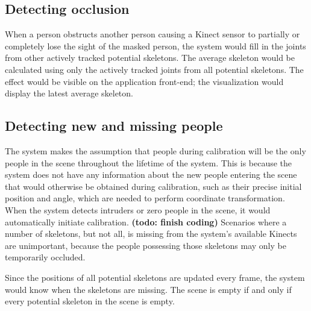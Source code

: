 \subsection{Detecting occlusion}

When a person obstructs another person causing a Kinect sensor to partially or completely lose the sight of the masked person, the system would fill in the joints from other actively tracked potential skeletons. The average skeleton would be calculated using only the actively tracked joints from all potential skeletons. The effect would be visible on the application front-end; the visualization would display the latest average skeleton.

\subsection{Detecting new and missing people}

The system makes the assumption that people during calibration will be the only people in the scene throughout the lifetime of the system. This is because the system does not have any information about the new people entering the scene that would otherwise be obtained during calibration, such as their precise initial position and angle, which are needed to perform coordinate transformation. When the system detects intruders or zero people in the scene, it would automatically initiate calibration. \textbf{(todo: finish coding)} Scenarios where a number of skeletons, but not all, is missing from the system's available Kinects are unimportant, because the people possessing those skeletons may only be temporarily occluded.

Since the positions of all potential skeletons are updated every frame, the system would know when the skeletons are missing. The scene is empty if and only if every potential skeleton in the scene is empty.


